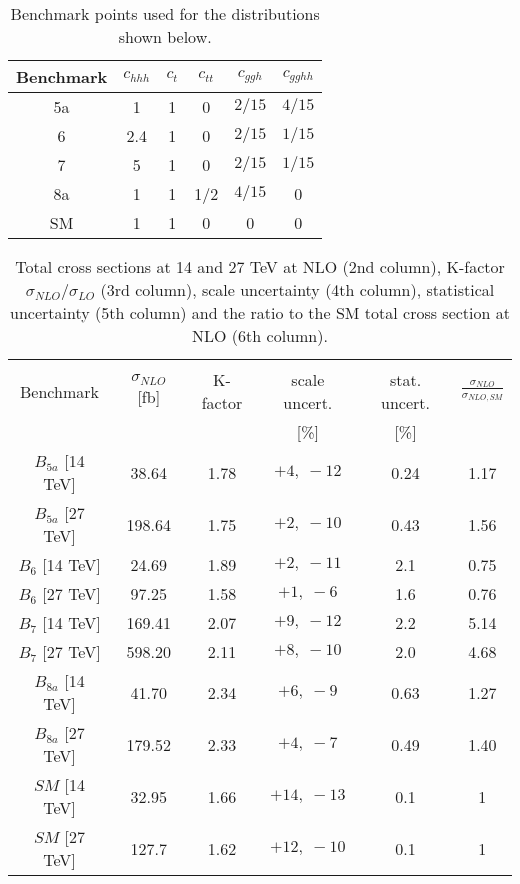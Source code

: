 \begin{table}[htb]
\begin{center}
\begin{tabular}{| c | c  c  c  c  c |}
\hline
Benchmark & $c_{hhh}$ & $c_t$ & $c_{tt}$ & $c_{ggh}$ & $c_{gghh}$ \\
\hline
5a & 1 & 1 & 0 &   $2/15$ & $4/15$\\
\hline
6 & 2.4 & 1 & 0 & $2/15$ & $1/15$  \\
\hline
7 & 5 & 1 & 0 & $2/15$ & $1/15$  \\
\hline
8a & 1 & 1 & 1/2 & $4/15$ & 0\\
\hline
SM & 1 & 1 & 0 & 0 & 0 \\
\hline
\end{tabular}
\end{center}
\caption{Benchmark points used for the distributions shown below.\label{tab:benchmarks}}
\end{table}
%
\begin{table}[htb]
\begin{center}
\begin{tabular}{|c|c|c|c|c|c|}
\hline
&&&&&\\
Benchmark & $\sigma_{NLO}$ [fb] & K-factor & scale uncert.  &
stat. uncert.   &$\frac{\sigma_{NLO}}{\sigma_{NLO,SM}}$ \\ 
&&&[\%] &[\%] &\\
\hline
$    B_{5a}$ [14 TeV] & 38.64 & 1.78& ${+4, \; -12}$ &0.24  &1.17  \\ 
$    B_{5a}$ [27 TeV] & 198.64 & 1.75 & ${+2, \; -10}$ & 0.43 & 1.56  \\ 
\hline
$    B_{6}$ [14 TeV] &  24.69 & 1.89 & ${+2, \; -11}$ & 2.1 & 0.75 \\ 
$    B_{6}$ [27 TeV] &  97.25 &  1.58& ${+1, \; -6}$ &1.6  & 0.76  \\ 
\hline
$   B_7$ [14 TeV] & 169.41 & 2.07& ${+9, \; -12}$ & 2.2 & 5.14 \\
$   B_7$ [27 TeV] & 598.20 & 2.11 & ${+8, \; -10}$ & 2.0 &  4.68\\
\hline 
$   B_{8a}$ [14 TeV] & 41.70 & 2.34& ${+6, \; -9}$ & 0.63 & 1.27 \\
$   B_{8a}$ [27 TeV] & 179.52 & 2.33 & ${+4, \; -7}$ & 0.49 & 1.40 \\
\hline 
$   SM $ [14 TeV] & 32.95 & 1.66 & ${+14, \; -13}$ & 0.1 & 1\\
$   SM $ [27 TeV] & 127.7&  1.62 & ${+12, \; -10}$ & 0.1 & 1\\
\hline
\end{tabular}
\end{center}
\caption{Total cross sections at 14 and 27 TeV at NLO (2nd column),
K-factor $\sigma_{NLO}/\sigma_{LO}$ (3rd column),
scale uncertainty (4th column), statistical uncertainty (5th column)
and the ratio to the SM total cross section at NLO (6th column).\label{sigmatot}}
\end{table}
